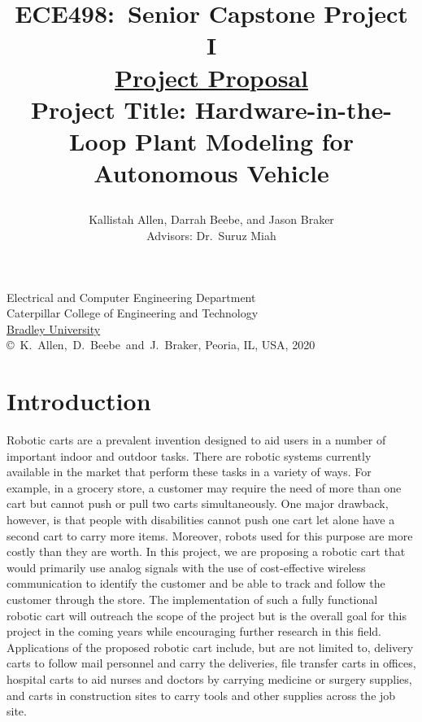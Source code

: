 \documentclass[letterpaper,12pt]{article}   %
\title{ECE498:~Senior Capstone Project I\\\textbf{\underline{Project Proposal}}\\
\vspace{0.5in}
Project Title: Hardware-in-the-Loop Plant Modeling for Autonomous Vehicle 
\vspace{1.0in}
\author{Kallistah Allen, Darrah Beebe, and Jason Braker\\ Advisors: Dr.~Suruz Miah}
}
\date{}  %
\begin{document}
\begin{titlepage}
 \maketitle

\vspace*{4.0cm}
\begin{center}
\normalsize
Electrical and Computer Engineering Department\\
Caterpillar College of Engineering and Technology\\
\href{http://www.bradley.edu/}{Bradley University}\\

\vspace*{6.0cm}
\copyright~K.~Allen,~D.~Beebe~and~J.~Braker, Peoria, IL, USA, 2020\\

\end{center}
\thispagestyle{empty}

\end{titlepage} 
\newpage
\renewcommand{\contentsname}{Table of Contents}
\tableofcontents
\newpage

\section{Introduction}
Robotic carts are a prevalent invention designed to aid users in a number of important indoor and outdoor tasks. There are robotic systems currently available in the market that perform these tasks in a variety of ways. For example, in a grocery store, a customer may require the need of more than one cart but cannot push or pull two carts simultaneously. One major drawback, however, is that people with disabilities cannot push one cart let alone have a second cart to carry more items. Moreover, robots used for this purpose are more costly than they are worth. In this project, we are proposing a robotic cart that would primarily use analog signals with the use of cost-effective wireless communication to identify the customer and be able to track and follow the customer through the store. The implementation of such a fully functional robotic cart will outreach the scope of the project but is the overall goal for this project in the coming years while encouraging further research in this field. Applications of the proposed robotic cart include, but are not limited to, delivery carts to follow mail personnel and carry the deliveries, file transfer carts in offices, hospital carts to aid nurses and doctors by carrying medicine or surgery supplies, and carts in construction sites to carry tools and other supplies across the job site.
\end{document}
